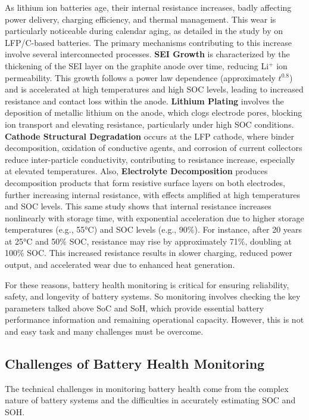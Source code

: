 As lithium ion batteries age, their internal resistance increases, badly affecting power delivery, charging efficiency, and thermal management. This wear is particularly noticeable during calendar aging, as detailed in the study by \cite{stroe_degradation_2018} on LFP/C-based batteries. The primary mechanisms contributing to this increase involve several interconnected processes. \textbf{SEI Growth} is characterized by the thickening of the SEI layer on the graphite anode over time, reducing Li$^+$ ion permeability. This growth follows a power law dependence (approximately $t^{0.8}$) and is accelerated at high temperatures and high SOC levels, leading to increased resistance and contact loss within the anode. \textbf{Lithium Plating} involves the deposition of metallic lithium on the anode, which clogs electrode pores, blocking ion transport and elevating resistance, particularly under high SOC conditions. \textbf{Cathode Structural Degradation} occurs at the LFP cathode, where binder decomposition, oxidation of conductive agents, and corrosion of current collectors reduce inter-particle conductivity, contributing to resistance increase, especially at elevated temperatures. Also, \textbf{Electrolyte Decomposition} produces decomposition products that form resistive surface layers on both electrodes, further increasing internal resistance, with effects amplified at high temperatures and SOC levels. This same study shows that internal resistance increases nonlinearly with storage time, with exponential acceleration due to higher storage temperatures (e.g., 55°C) and SOC levels (e.g., 90\%). For instance, after 20 years at 25°C and 50\% SOC, resistance may rise by approximately 71\%, doubling at 100\% SOC. This increased resistance results in slower charging, reduced power output, and accelerated wear due to enhanced heat generation.

For these reasons, battery health monitoring is critical for ensuring reliability, safety, and longevity of battery systems. So monitoring involves checking the key parameters talked above SoC and SoH, which provide essential battery performance information and remaining operational capacity. However, this is not and easy task and many challenges must be overcome. 



\subsection{Challenges of Battery Health Monitoring}
The technical challenges in monitoring battery health come from the complex nature of battery systems and the difficulties in accurately estimating SOC and SOH.

